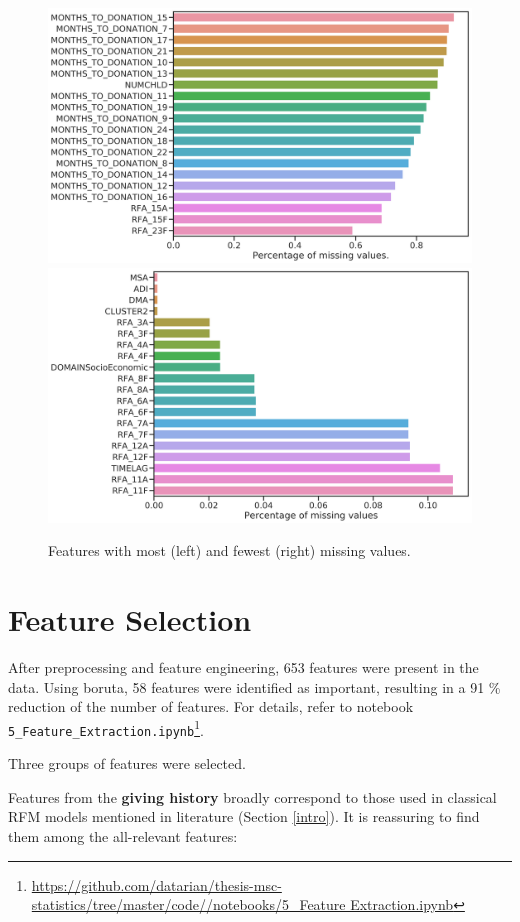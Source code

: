 \documentclass[
  11pt,
  a4paper,
  DIV=12,captions=tableheading,oneside,titlepage]{scrbook}
\begin{document}
\begin{figure}

{\centering \includegraphics[width=0.49\linewidth]{figures/imputation/most-missing} \includegraphics[width=0.49\linewidth]{figures/imputation/fewest-missing} 

}

\caption{Features with most (left) and fewest (right) missing values.}\label{fig:most-fewest-missing}
\end{figure}

\hypertarget{feature-selection}{%
\section{Feature Selection}\label{feature-selection}}

After preprocessing and feature engineering, 653 features were present in the data. Using boruta, 58 features were identified as important, resulting in a 91 \% reduction of the number of features. For details, refer to notebook \texttt{5\_Feature\_Extraction.ipynb}\footnote{\href{https://github.com/datarian/thesis-msc-statistics/tree/master/code//notebooks/5_Feature\%20Extraction.ipynb}{https://github.com/datarian/thesis-msc-statistics/tree/master/code//notebooks/5\_Feature Extraction.ipynb}}.

Three groups of features were selected.

Features from the \textbf{giving history} broadly correspond to those used in classical RFM models mentioned in literature (Section \ref{intro}). It is reassuring to find them among the all-relevant features:
\end{document}
